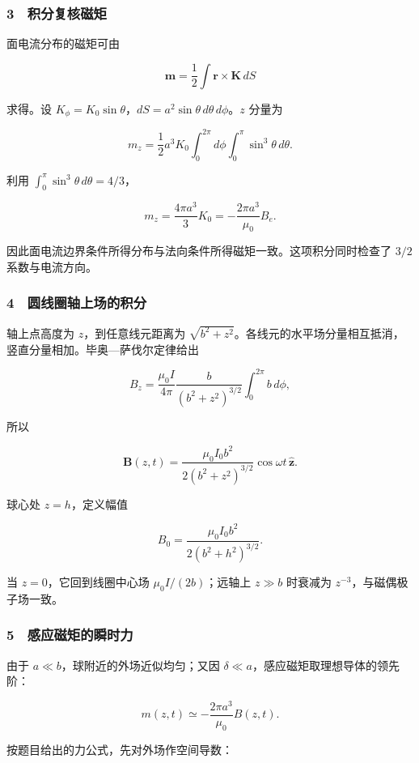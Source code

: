 \documentclass[12pt,a4paper,fontset=fandol]{ctexart}
\begin{document}
\subsubsection{3　积分复核磁矩}\label{ux79efux5206ux590dux6838ux78c1ux77e9}

面电流分布的磁矩可由

\[\boldsymbol m=\frac12\int\boldsymbol r\times\boldsymbol K\,dS\]

求得。设
\(K_\phi=K_0\sin\theta\)，\(dS=a^2\sin\theta\,d\theta\,d\phi\)。\(z\)
分量为

\[m_z=\frac12a^3K_0\int_0^{2\pi}d\phi
\int_0^\pi\sin^3\theta\,d\theta.\]

利用 \(\int_0^\pi\sin^3\theta\,d\theta=4/3\)，

\[m_z=\frac{4\pi a^3}{3}K_0
=-\frac{2\pi a^3}{\mu_0}B_e.\]

因此面电流边界条件所得分布与法向条件所得磁矩一致。这项积分同时检查了
\(3/2\) 系数与电流方向。

\subsubsection{4　圆线圈轴上场的积分}\label{ux5706ux7ebfux5708ux8f74ux4e0aux573aux7684ux79efux5206}

轴上点高度为 \(z\)，到任意线元距离为
\(\sqrt{b^2+z^2}\)。各线元的水平场分量相互抵消，竖直分量相加。毕奥---萨伐尔定律给出

\[B_z=\frac{\mu_0I}{4\pi}
\frac b{(b^2+z^2)^{3/2}}\int_0^{2\pi}b\,d\phi,\]

所以

\[\boxed{\boldsymbol B(z,t)=
\frac{\mu_0I_0b^2}{2(b^2+z^2)^{3/2}}
\cos\omega t\,\hat{\boldsymbol z}.}\]

球心处 \(z=h\)，定义幅值

\[B_0=\frac{\mu_0I_0b^2}{2(b^2+h^2)^{3/2}}.\]

当 \(z=0\)，它回到线圈中心场 \(\mu_0I/(2b)\)；远轴上 \(z\gg b\) 时衰减为
\(z^{-3}\)，与磁偶极子场一致。

\subsubsection{5　感应磁矩的瞬时力}\label{ux611fux5e94ux78c1ux77e9ux7684ux77acux65f6ux529b}

由于 \(a\ll b\)，球附近的外场近似均匀；又因
\(\delta\ll a\)，感应磁矩取理想导体的领先阶：

\[m(z,t)\simeq-\frac{2\pi a^3}{\mu_0}B(z,t).\]

按题目给出的力公式，先对外场作空间导数：
\end{document}
